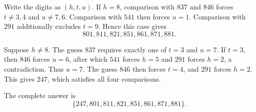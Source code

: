 Write the digits as $(h,t,u)$. If $h=8$, comparison with $837$ and $846$ forces $t\ne3,4$ and $u\ne7,6$. Comparison with $541$ then forces $u=1$. Comparison with $291$ additionally excludes $t=9$. Hence this case gives
\[
801,811,821,851,861,871,881.
\]

Suppose $h\ne8$. The guess $837$ requires exactly one of $t=3$ and $u=7$. If $t=3$, then $846$ forces $u=6$, after which $541$ forces $h=5$ and $291$ forces $h=2$, a contradiction. Thus $u=7$. The guess $846$ then forces $t=4$, and $291$ forces $h=2$. This gives $247$, which satisfies all four comparisons.

The complete answer is
\[
\boxed{\{247,801,811,821,851,861,871,881\}}.
\]
